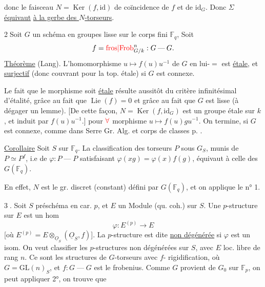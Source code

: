 donc le faisceau $N=\operatorname{Ker}(f,\mathrm{id})$ de coïncidence
de $f$ et de $\mathrm{id}_G$. Donc $\Sigma$ \uline{équivaut}
\uline{à la gerbe des $N$-torseurs}.

\textcircled{2}\quad Soit $G$ un schéma en groupes lisse  sur le
corps fini $\mathbb F_q$,  Soit
\[
f={\color{red}\mathrm{fros}|\mathrm{Frob}}^n_{G/k}:G\mathbin{\text{---}}G.
\]
\uline{Théorème} (Lang). L'homomorphisme $u\mapsto f(u)u^{-1}$ de $G$ en
lui-$=$ est \uline{étale}, et \uline{surjectif} (donc couvrant
pour la top. étale) si $G$ est connexe.

Le fait que le morphisme soit \uline{étale} résulte
aussitôt du critère infinitésimal d'étalité, grâce au fait
que  $\operatorname{Lie}(f)=0$ et grâce au fait que $G$
est lisse (à dégager un lemme). 
[De cette façon, $N=\operatorname{Ker}(f,\mathrm{id}_G)$ est un groupe étale
 sur $k$, et
induit par $f(u)u^{-1}$.]
 pour ${\color{red}\forall}$
morphisme $u\mapsto f(u)g u^{-1}$. On termine, si $G$
est connexe, comme dans Serre Gr. Alg. et corps de classes
p. .



\uline{Corollaire} Soit $S$ sur $\mathbb F_q$. La classification des
torseurs $P$ sous $G_S$, munis de $P\simeq P^f$, i.e
de $\varphi:P\mathbin{\text{---}}P$ satisfaisant $\varphi(xg)=\varphi(x)f(g)$, équivaut
à celle des 
$G(\mathbb F_q)$.

En effet, $N$ est le gr. discret  (constant)
défini par $G(\mathbb F_q)$, et on applique le n° 1.

\textcircled{3}. Soit $S$ préschéma en car. $p$, et $E$ un
Module (qu. coh.) sur $S$. Une $p$-structure sur $E$
est un hom
\[
\varphi:E^{(p)}\longrightarrow E
\]
[où $E^{(p)}=E\otimes_{\underline O_S}(\underline O_S,f)$]. La $p$-structure est
dite \uline{non dégénérée} si $\varphi$ est un isom.
On veut classifier les $p$-structures non
dégénérées sur $S$, avec $E$ loc. libre de rang $n$.
Ce sont les structures de $G$-torseurs avec $f$-
rigidification, où $G=\mathrm{GL}(n)_S$, et $f:G\mathbin{\text{---}}G$
est le frobenius. Comme $G$ provient de
$G_0$ sur $\mathbb F_p$, on peut appliquer 2°, on trouve que

